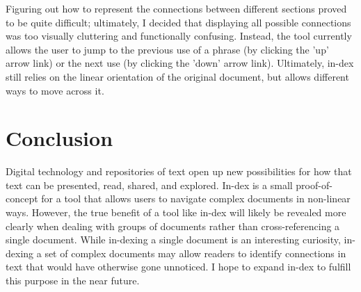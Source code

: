 \documentclass[12pt]{article}
\begin{document}
	Figuring out how to represent the connections between different sections
	proved to be quite difficult; ultimately, I decided that displaying all
	possible connections was too visually cluttering and functionally
	confusing. Instead, the tool currently allows the user to jump to the
	previous use of a phrase (by clicking the 'up' arrow link) or the next use
	(by clicking the 'down' arrow link). Ultimately, in-dex still relies on
	the linear orientation of the original document, but allows different ways
	to move across it.

	\section{Conclusion}

	Digital technology and repositories of text open up new possibilities for
	how that text can be presented, read, shared, and explored.  In-dex is a
	small proof-of-concept for a tool that allows users to navigate complex
	documents in non-linear ways. However, the true benefit of a tool like
	in-dex will likely be revealed more clearly when dealing with groups of
	documents rather than cross-referencing a single document. While in-dexing
	a single document is an interesting curiosity, in-dexing a set of complex
	documents may allow readers to identify connections in text that would have
	otherwise gone unnoticed. I hope to expand in-dex to fulfill this purpose
	in the near future.

	\printbibliography
\end{document}
